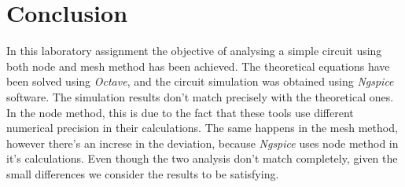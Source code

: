 \section{Conclusion}
\label{sec:conclusion}

In this laboratory assignment the objective of analysing a simple circuit using both node and mesh method has been achieved. The theoretical equations have been solved using \textit{Octave}, and the circuit simulation was obtained using \textit{Ngspice} software. The simulation results don't match precisely with the theoretical ones. In the node method, this is due to the fact that these tools use different numerical precision in their calculations. The same happens in the mesh method, however there's an increse in the deviation, because \textit{Ngspice} uses node method in it's calculations. Even though the two analysis don't match completely, given the small differences we consider the results to be satisfying.
